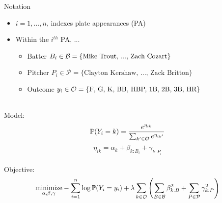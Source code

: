 \documentclass[handout]{beamer}
\def\P{\mathcal P}\def\Q{\mathcal Q}\def\R{\mathcal R}\def\S{\mathcal S}
\def\l{\left}\def\r{\right}\def\lf{\lfloor}\def\rf{\rfloor}
\begin{document}
\begin{frame}{Notation}
  \begin{itemize}
    \item $i = 1, ..., n$, indexes plate appearances (PA)
    \item Within the $i^{th}$ PA, ...
    \begin{itemize}
      \item Batter $B_i \in \mathcal B = \mbox{\{Mike Trout, ..., Zach Cozart\}}$
      \item Pitcher $P_i \in \P = \mbox{\{Clayton Kershaw, ..., Zack Britton\}}$
      \item Outcome $y_i \in \mathcal O = \mbox{\{F, G, K, BB, HBP, 1B, 2B, 3B, HR\}}$
    \end{itemize}
  \end{itemize}
  ~\\
  Model:
  $$\mathbb P(Y_i = k) = \frac{e^{\eta_{ik}}}{\sum_{k' \in \mathcal O}e^{\eta_{ik'}}}$$
  $$\eta_{ik} = \alpha_k + \beta_{k:B_i} + \gamma_{k:P_i}$$
  ~\\
  Objective:
  $$\underset{\alpha, \beta, \gamma}{\mbox{minimize}}
    -\sum_{i=1}^n\log\mP(Y_i = y_i) + \lambda\sum_{k \in \O}
    \l(\sum_{B \in \B}\beta_{k:B}^2 + \sum_{P \in \P}\gamma_{k:P}^2\r)$$
\end{frame}
\end{document}
